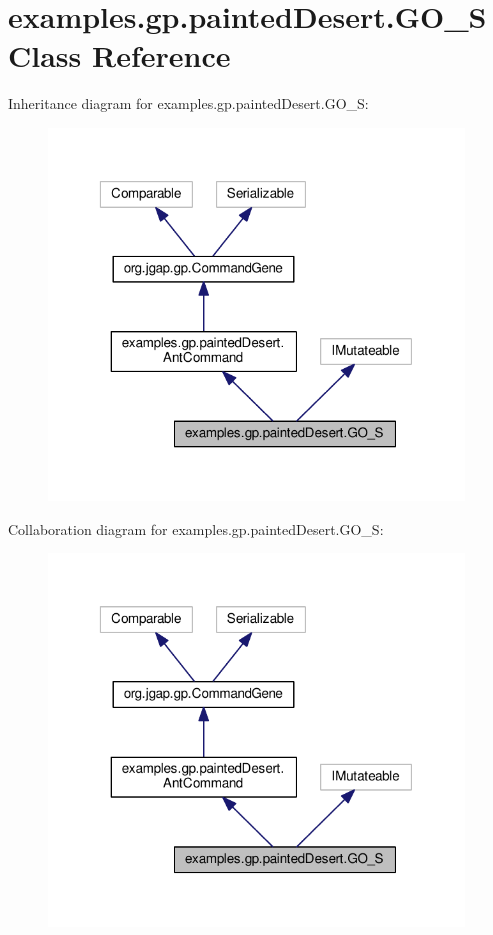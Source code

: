 \hypertarget{classexamples_1_1gp_1_1painted_desert_1_1_g_o___s}{\section{examples.\-gp.\-painted\-Desert.\-G\-O\-\_\-\-S Class Reference}
\label{classexamples_1_1gp_1_1painted_desert_1_1_g_o___s}
}


Inheritance diagram for examples.\-gp.\-painted\-Desert.\-G\-O\-\_\-\-S\-:
\nopagebreak
\begin{figure}[H]
\begin{center}
\leavevmode
\includegraphics[width=313pt]{classexamples_1_1gp_1_1painted_desert_1_1_g_o___s__inherit__graph}
\end{center}
\end{figure}


Collaboration diagram for examples.\-gp.\-painted\-Desert.\-G\-O\-\_\-\-S\-:
\nopagebreak
\begin{figure}[H]
\begin{center}
\leavevmode
\includegraphics[width=313pt]{classexamples_1_1gp_1_1painted_desert_1_1_g_o___s__coll__graph}
\end{center}
\end{figure}
